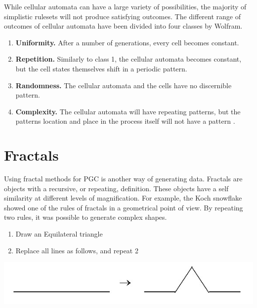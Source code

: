 \documentclass[10pt]{report}
\begin{document}
		While cellular automata can have a large variety of possibilities, the majority of simplistic rulesets will not produce satisfying outcomes. The different range of outcomes of cellular automata have been divided into four classes by Wolfram.
		
		\begin{enumerate}
			\item \textbf{Uniformity.} After a number of generations, every cell becomes constant.
			\item \textbf{Repetition.} Similarly to class 1, the cellular automata becomes constant, but the cell states themselves shift in a periodic pattern.
			\item \textbf{Randomness.} The cellular automata and the cells have no discernible pattern. 
			\item \textbf{Complexity.} The cellular automata will have repeating patterns, but the patterns location and place in the process itself will not have a pattern \cite{nature-of-code}. 
		\end{enumerate}
	
	\vspace{10pt}
	\let\clearpage\relax
	\chapter{Fractals} \label{chap:fractal}
		Using fractal methods for PGC is another way of generating data. Fractals are objects with a recursive, or repeating, definition. These objects have a self similarity at different levels of magnification. For example, the Koch snowflake showed one of the rules of fractals in a geometrical point of view. By repeating two rules, it was possible to generate complex shapes.
		
		\begin{enumerate}
			\item Draw an Equilateral triangle
			\item Replace all lines as follows, and repeat 2
		\end{enumerate}
	
		\begin{minipage}{\textwidth}
			\centering
			\includegraphics[scale=0.5]{m_reprule}
			\label{fig:m_reprule}
		\end{minipage}
	
\end{document}
